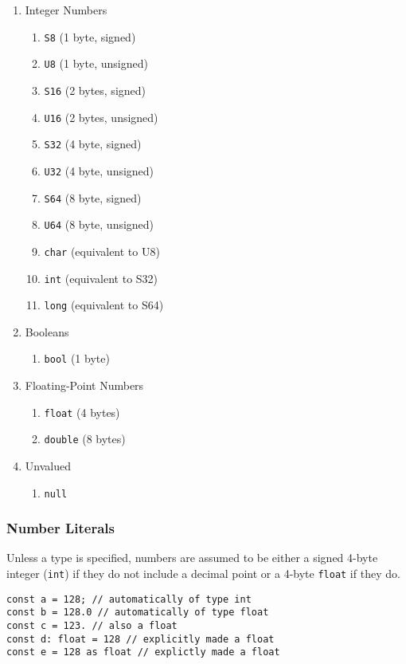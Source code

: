 \documentclass[12pt]{article}
\begin{document}
\begin{enumerate}
	\item Integer Numbers
	\begin{enumerate}
		\item \lstinline!S8! (1 byte, signed)
		\item \lstinline!U8! (1 byte, unsigned)
		\item \lstinline!S16! (2 bytes, signed)
		\item \lstinline!U16! (2 bytes, unsigned)
		\item \lstinline!S32! (4 byte, signed)
		\item \lstinline!U32! (4 byte, unsigned)
		\item \lstinline!S64! (8 byte, signed)
		\item \lstinline!U64! (8 byte, unsigned)
		\item \lstinline!char! (equivalent to U8)
		\item \lstinline!int! (equivalent to S32)
		\item \lstinline!long! (equivalent to S64)
	\end{enumerate}
	\item Booleans
	\begin{enumerate}
		\item \lstinline!bool! (1 byte)
	\end{enumerate}
	\item Floating-Point Numbers
	\begin{enumerate}
		\item \lstinline!float! (4 bytes)
		\item \lstinline!double! (8 bytes)
	\end{enumerate}
	\item Unvalued
	\begin{enumerate}
		\item \lstinline!null!
	\end{enumerate}
\end{enumerate}

\subsubsection{Number Literals}

Unless a type is specified, numbers are assumed to be either a signed 4-byte integer (\lstinline!int!) if they do not include a decimal point or a 4-byte \lstinline!float! if they do.

\begin{lstlisting}
const a = 128; // automatically of type int
const b = 128.0 // automatically of type float
const c = 123. // also a float
const d: float = 128 // explicitly made a float
const e = 128 as float // explictly made a float 
\end{lstlisting}
\end{document}
